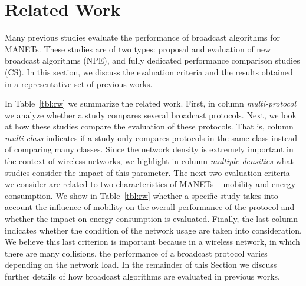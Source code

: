 
\section{Related Work}
\label{sec:related_work}


Many previous studies evaluate the performance of broadcast algorithms for MANETs.
These studies are of two types: proposal and evaluation of new broadcast algorithms (NPE), and fully dedicated performance comparison studies (CS).
In this section, we discuss the evaluation criteria and the results obtained in a representative set of previous works.

In Table~\ref{tbl:rw} we summarize the related work.
First, in column \textit{multi-protocol} we analyze  whether a study compares several broadcast protocols.
Next, we look at how these studies compare the evaluation of these protocols. 
That is, column \textit{multi-class} indicates if a study only compares protocols in the same class instead of comparing many classes.
Since the network density is extremely important in the context of wireless networks, we highlight in column \textit{multiple densities} what studies consider the impact of this parameter.
The next two evaluation criteria we consider are related to two characteristics of MANETs -- mobility and energy consumption.
We show in Table~\ref{tbl:rw} whether a specific study takes into account the influence of mobility on the overall performance of the protocol and whether the impact on energy consumption is evaluated.
Finally, the last column indicates whether the condition of the network usage are taken into consideration.
We believe this last criterion is important because in a wireless network, in which there are many collisions, the performance of a broadcast protocol varies depending on the network load.
In the remainder of this Section we discuss further details of how broadcast algorithms are evaluated in previous works.



